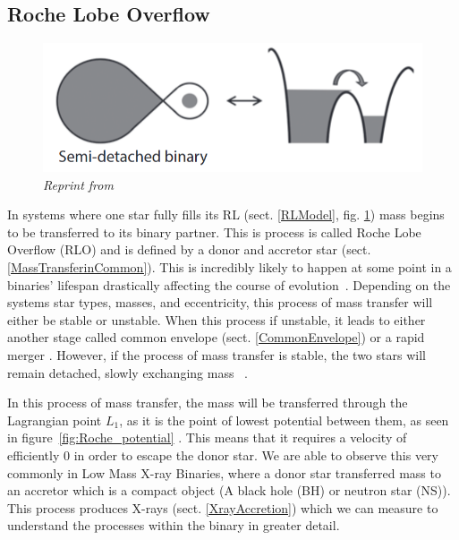 \documentclass[12pt, a4paper]{article}
\begin{document}
        \subsection{\centering Roche Lobe Overflow}\label{RLO} %

        \begin{figure}[h] 
            \centering
            \includegraphics[scale = .4]{Figs/Semi-detached binary.png}
            \caption{\textit{Reprint from~\cite{TaurisvandenHeuvel+2023}}}
            \label{SemidetachedRL}
        \end{figure}

        In systems where one star fully fills its RL (sect. \ref{RLModel}, fig. \ref{SemidetachedRL}) mass begins to be transferred to its binary partner. This is process is called Roche Lobe Overflow (RLO) and is defined by a donor and accretor star (sect. \ref{MassTransferinCommon}). This is incredibly likely to happen at some point in a binaries' lifespan drastically affecting the course of evolution~\cite{TaurisvandenHeuvel+2023}\cite{Chen_2024}\cite{Chen_2024}. Depending on the systems star types, masses, and eccentricity, this process of mass transfer will either be stable or unstable. When this process if unstable, it leads to either another stage called common envelope (sect. \ref{CommonEnvelope}) or a rapid merger \cite{TaurisvandenHeuvel+2023}. However, if the process of mass transfer is stable, the two stars will remain detached, slowly exchanging mass~\cite{Chen_2024} \cite{TaurisvandenHeuvel+2023}.

        In this process of mass transfer, the mass will be transferred through the Lagrangian point $L_1$, as it is the point of lowest potential between them, as seen in figure~\ref{fig:Roche_potential} \cite{TaurisvandenHeuvel+2023}. This means that it requires a velocity of efficiently 0 in order to escape the donor star. We are able to observe this very commonly in Low Mass X-ray Binaries, where a donor star transferred mass to an accretor which is a compact object (A black hole (BH) or neutron star (NS)). This process produces X-rays (sect. \ref{XrayAccretion}) which we can measure to understand the processes within the binary in greater detail.
\end{document}
